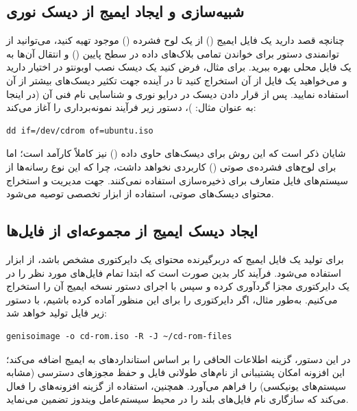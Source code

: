 \subsection{شبیه‌سازی و ایجاد ایمیج از دیسک نوری}

چنانچه قصد دارید یک فایل ایمیج () از یک لوح فشرده () موجود تهیه کنید، می‌توانید از توانمندی دستور  برای خواندن تمامی بلاک‌های داده در سطح پایین () و انتقال آن‌ها به یک فایل محلی بهره ببرید. برای مثال، فرض کنید یک دیسک نصب اوبونتو در اختیار دارید و می‌خواهید یک فایل  از آن استخراج کنید تا در آینده جهت تکثیر دیسک‌های بیشتر از آن استفاده نمایید. پس از قرار دادن دیسک در درایو نوری و شناسایی نام فنی آن (در اینجا به عنوان مثال: )، دستور زیر فرآیند نمونه‌برداری را آغاز می‌کند:

\begin{latin}
\begin{lstlisting}
dd if=/dev/cdrom of=ubuntu.iso
\end{lstlisting}
\end{latin}

شایان ذکر است که این روش برای دیسک‌های  حاوی داده () نیز کاملاً کارآمد است؛ اما برای لوح‌های فشرده‌ی صوتی () کاربردی نخواهد داشت، چرا که این نوع رسانه‌ها از سیستم‌های فایل متعارف برای ذخیره‌سازی استفاده نمی‌کنند. جهت مدیریت و استخراج محتوای دیسک‌های صوتی، استفاده از ابزار تخصصی  توصیه می‌شود.

\subsection{ایجاد دیسک ایمیج از مجموعه‌ای از فایل‌ها}

برای تولید یک فایل ایمیج  که دربرگیرنده محتوای یک دایرکتوری مشخص باشد، از ابزار  استفاده می‌شود. فرآیند کار بدین صورت است که ابتدا تمام فایل‌های مورد نظر را در یک دایرکتوری مجزا گردآوری کرده و سپس با اجرای دستور  نسخه ایمیج آن را استخراج می‌کنیم. به‌طور مثال، اگر دایرکتوری  را برای این منظور آماده کرده باشیم، با دستور زیر فایل  تولید خواهد شد:

\begin{latin}
\begin{lstlisting}
genisoimage -o cd-rom.iso -R -J ~/cd-rom-files
\end{lstlisting}
\end{latin}

در این دستور، گزینه  اطلاعات الحاقی را بر اساس استانداردهای  به ایمیج اضافه می‌کند؛ این افزونه امکان پشتیبانی از نام‌های طولانی فایل و حفظ مجوزهای دسترسی  (مشابه سیستم‌های یونیکسی) را فراهم می‌آورد. همچنین، استفاده از گزینه  افزونه‌های  را فعال می‌کند که سازگاری نام فایل‌های بلند را در محیط سیستم‌عامل ویندوز تضمین می‌نماید.


